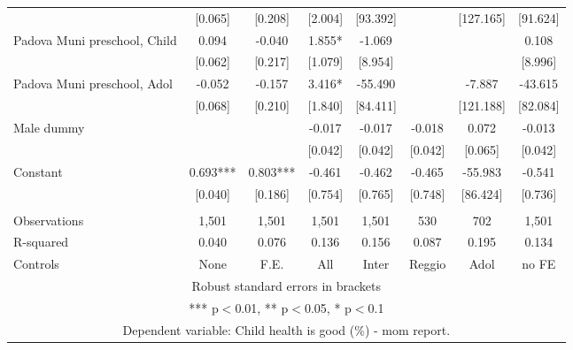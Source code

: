 \begin{tabular}{lccccccc}
 & [0.065] & [0.208] & [2.004] & [93.392] &  & [127.165] & [91.624] \\
Padova Muni preschool, Child & 0.094 & -0.040 & 1.855* & -1.069 &  &  & 0.108 \\
 & [0.062] & [0.217] & [1.079] & [8.954] &  &  & [8.996] \\
Padova Muni preschool, Adol & -0.052 & -0.157 & 3.416* & -55.490 &  & -7.887 & -43.615 \\
 & [0.068] & [0.210] & [1.840] & [84.411] &  & [121.188] & [82.084] \\
Male dummy &  &  & -0.017 & -0.017 & -0.018 & 0.072 & -0.013 \\
 &  &  & [0.042] & [0.042] & [0.042] & [0.065] & [0.042] \\
Constant & 0.693*** & 0.803*** & -0.461 & -0.462 & -0.465 & -55.983 & -0.541 \\
 & [0.040] & [0.186] & [0.754] & [0.765] & [0.748] & [86.424] & [0.736] \\
 &  &  &  &  &  &  &  \\
Observations & 1,501 & 1,501 & 1,501 & 1,501 & 530 & 702 & 1,501 \\
R-squared & 0.040 & 0.076 & 0.136 & 0.156 & 0.087 & 0.195 & 0.134 \\
 Controls & None & F.E. & All & Inter & Reggio & Adol & no FE \\ \hline
\multicolumn{8}{c}{ Robust standard errors in brackets} \\
\multicolumn{8}{c}{ *** p$<$0.01, ** p$<$0.05, * p$<$0.1} \\
\multicolumn{8}{c}{ Dependent variable: Child health is good (\%) - mom report.} \\
\end{tabular}
